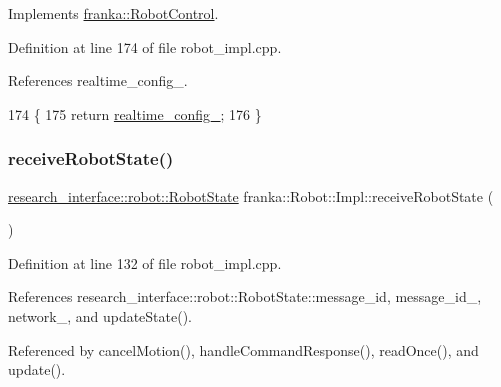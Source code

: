 Implements \hyperlink{classfranka_1_1RobotControl_aca02c0c27b863d4a42e08d541c400832}{franka\+::\+Robot\+Control}.



Definition at line 174 of file robot\+\_\+impl.\+cpp.



References realtime\+\_\+config\+\_\+.


\begin{DoxyCode}
174                                                         \{
175   \textcolor{keywordflow}{return} \hyperlink{classfranka_1_1Robot_1_1Impl_af740b3f1aca49659f5d81501f3c83cad}{realtime\_config\_};
176 \}
\end{DoxyCode}
\mbox{\label{classfranka_1_1Robot_1_1Impl_a15161988fd2644aa2757e196e4488b38}} 
\subsubsection{\texorpdfstring{receive\+Robot\+State()}{receiveRobotState()}}
{\footnotesize\ttfamily \hyperlink{structresearch__interface_1_1robot_1_1RobotState}{research\+\_\+interface\+::robot\+::\+Robot\+State} franka\+::\+Robot\+::\+Impl\+::receive\+Robot\+State (\begin{DoxyParamCaption}{ }\end{DoxyParamCaption})\hspace{0.3cm}{\ttfamily [private]}}



Definition at line 132 of file robot\+\_\+impl.\+cpp.



References research\+\_\+interface\+::robot\+::\+Robot\+State\+::message\+\_\+id, message\+\_\+id\+\_\+, network\+\_\+, and update\+State().



Referenced by cancel\+Motion(), handle\+Command\+Response(), read\+Once(), and update().


